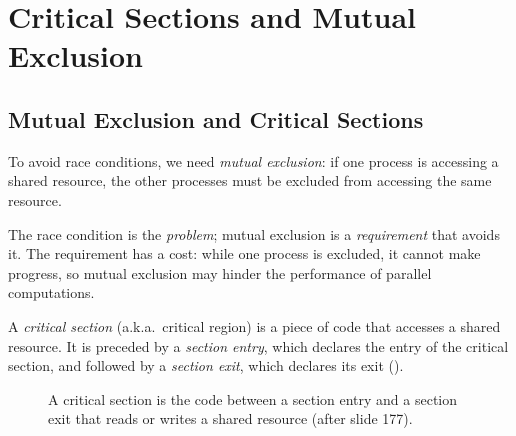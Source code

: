 \section{Critical Sections and Mutual Exclusion}
\label{sec:cs}

\subsection{Mutual Exclusion and Critical Sections}

\begin{definition}
  To avoid race conditions, we need \emph{mutual exclusion}: if one process is accessing a shared resource, the other processes must be excluded from accessing the same resource.
\end{definition}

The race condition is the \emph{problem}; mutual exclusion is a \emph{requirement} that avoids it. The requirement has a cost: while one process is excluded, it cannot make progress, so mutual exclusion may hinder the performance of parallel computations.

\begin{definition}
  A \emph{critical section} (a.k.a.\ critical region) is a piece of code that accesses a shared resource. It is preceded by a \emph{section entry}, which declares the entry of the critical section, and followed by a \emph{section exit}, which declares its exit ().
\end{definition}

\begin{figure}[htbp]
\centering
{}
\caption{A critical section is the code between a section entry and a section exit that reads or writes a shared resource (after slide 177).}
\label{fig:csframe}
\end{figure}

